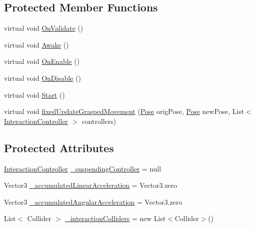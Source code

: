 \subsection*{Protected Member Functions}
\begin{DoxyCompactItemize}
\item 
virtual void \mbox{\hyperlink{class_leap_1_1_unity_1_1_interaction_1_1_interaction_behaviour_a1a7a6e32f61fa0819c7d35107f3c7fd4}{On\+Validate}} ()
\item 
virtual void \mbox{\hyperlink{class_leap_1_1_unity_1_1_interaction_1_1_interaction_behaviour_a977d761c28ec527aedebd97ce9f8b981}{Awake}} ()
\item 
virtual void \mbox{\hyperlink{class_leap_1_1_unity_1_1_interaction_1_1_interaction_behaviour_af4b5101862906b5d2c7da28136778a8f}{On\+Enable}} ()
\item 
virtual void \mbox{\hyperlink{class_leap_1_1_unity_1_1_interaction_1_1_interaction_behaviour_a294a2ea9c5524c0c8460006df32371b2}{On\+Disable}} ()
\item 
virtual void \mbox{\hyperlink{class_leap_1_1_unity_1_1_interaction_1_1_interaction_behaviour_ae5fabec0a3dbf845c0307b5eb813e993}{Start}} ()
\item 
virtual void \mbox{\hyperlink{class_leap_1_1_unity_1_1_interaction_1_1_interaction_behaviour_a55d343326d23259bd514650de4b608c0}{fixed\+Update\+Grasped\+Movement}} (\mbox{\hyperlink{struct_leap_1_1_unity_1_1_pose}{Pose}} orig\+Pose, \mbox{\hyperlink{struct_leap_1_1_unity_1_1_pose}{Pose}} new\+Pose, List$<$ \mbox{\hyperlink{class_leap_1_1_unity_1_1_interaction_1_1_interaction_controller}{Interaction\+Controller}} $>$ controllers)
\end{DoxyCompactItemize}
\subsection*{Protected Attributes}
\begin{DoxyCompactItemize}
\item 
\mbox{\hyperlink{class_leap_1_1_unity_1_1_interaction_1_1_interaction_controller}{Interaction\+Controller}} \mbox{\hyperlink{class_leap_1_1_unity_1_1_interaction_1_1_interaction_behaviour_a963e175ec5b02dfd788e5af31ea1007e}{\+\_\+suspending\+Controller}} = null
\item 
Vector3 \mbox{\hyperlink{class_leap_1_1_unity_1_1_interaction_1_1_interaction_behaviour_a8c88531b538cda8bdcb2b877b48b5c53}{\+\_\+accumulated\+Linear\+Acceleration}} = Vector3.\+zero
\item 
Vector3 \mbox{\hyperlink{class_leap_1_1_unity_1_1_interaction_1_1_interaction_behaviour_a059f47f37ca9a4080ca61210f7bdaf70}{\+\_\+accumulated\+Angular\+Acceleration}} = Vector3.\+zero
\item 
List$<$ Collider $>$ \mbox{\hyperlink{class_leap_1_1_unity_1_1_interaction_1_1_interaction_behaviour_a13cf93ca8bd29d2e69a6c2d55f8a14d9}{\+\_\+interaction\+Colliders}} = new List$<$Collider$>$()
\end{DoxyCompactItemize}
